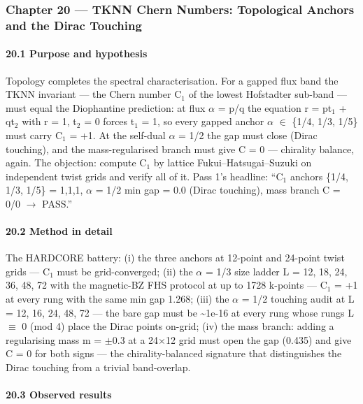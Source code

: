 \documentclass[10pt]{article}
\begin{document}
\subsubsection{Chapter 20 --- TKNN Chern Numbers: Topological Anchors and the Dirac Touching}

\paragraph{20.1 Purpose and hypothesis}

Topology completes the spectral characterisation. For a gapped flux band the TKNN invariant --- the Chern number C$_1$ of the lowest Hofstadter sub-band --- must equal the Diophantine prediction: at flux $\alpha$ = p/q the equation r = p\textperiodcentered{}t$_1$ + q\textperiodcentered{}t$_2$ with r = 1, t$_2$ = 0 forces t$_1$ = 1, so every gapped anchor $\alpha$ $\in$ \{1/4, 1/3, 1/5\} must carry C$_1$ = +1. At the self-dual $\alpha$ = 1/2 the gap must close (Dirac touching), and the mass-regularised branch must give C = 0 --- chirality balance, again. The objection: compute C$_1$ by lattice Fukui--Hatsugai--Suzuki on independent twist grids and verify all of it. Pass 1's headline: ``C$_1$ anchors \{1/4, 1/3, 1/5\} = 1,1,1, $\alpha$ = 1/2 min gap = 0.0 (Dirac touching), mass branch C = 0/0 $\rightarrow$ PASS.''

\paragraph{20.2 Method in detail}

The HARDCORE battery: (i) the three anchors at 12-point and 24-point twist grids --- C$_1$ must be grid-converged; (ii) the $\alpha$ = 1/3 size ladder L = 12, 18, 24, 36, 48, 72 with the magnetic-BZ FHS protocol at up to 1728 k-points --- C$_1$ = +1 at every rung with the same min gap 1.268; (iii) the $\alpha$ = 1/2 touching audit at L = 12, 16, 24, 48, 72 --- the bare gap must be \textasciitilde{}1e-16 at every rung whose rungs L $\equiv$ 0 (mod 4) place the Dirac points on-grid; (iv) the mass branch: adding a regularising mass m = $\pm$0.3 at a 24$\times$12 grid must open the gap (0.435) and give C = 0 for both signs --- the chirality-balanced signature that distinguishes the Dirac touching from a trivial band-overlap.

\paragraph{20.3 Observed results}
\end{document}
